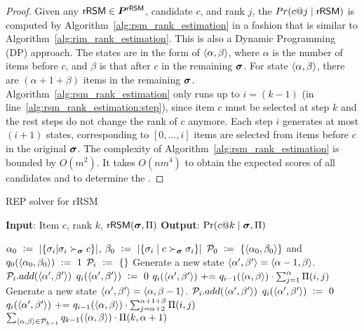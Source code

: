 \begin{proof}
    Given any $\mathsf{rRSM} \in \bm{P}^{\mathsf{rRSM}}$, candidate $c$, and rank $j$, the $Pr(c@j \mid \mathsf{rRSM})$ is computed by Algorithm~\ref{alg:rsm_rank_estimation} in a fashion that is similar to Algorithm~\ref{alg:rim_rank_estimation}.
    This is also a Dynamic Programming (DP) approach.
    The states are in the form of $\langle \alpha, \beta \rangle$, where $\alpha$ is the number of items before $c$, and $\beta$ is that after $c$ in the remaining $\bm{\sigma}$.
    For state $\langle \alpha, \beta \rangle$, there are $(\alpha + 1 + \beta)$ items in the remaining $\bm{\sigma}$.
    Algorithm~\ref{alg:rsm_rank_estimation} only runs up to $i=(k-1)$ (in line~\ref{alg:rsm_rank_estimation:step}), since item $c$ must be selected at step $k$ and the rest steps do not change the rank of $c$ anymore.
    Each step $i$ generates at most $(i + 1)$ states, corresponding to $[0, \ldots, i]$ items are selected from items before $c$ in the original $\bm{\sigma}$.
    The complexity of Algorithm~\ref{alg:rsm_rank_estimation} is bounded by $O(m^2)$.
    It takes $O(nm^4)$ to obtain the expected scores of all candidates and to determine the \mew.
    
\end{proof}

\begin{algorithm}[tb!]
    \caption{REP solver for rRSM}
    \label{alg:rsm_rank_estimation}
    \textbf{Input}: Item $c$, rank $k$, $\mathsf{rRSM}(\bm{\sigma}, \Pi)$ %
    \textbf{Output}: $\Pr(c@k \mid \bm{\sigma}, \Pi)$
    \begin{algorithmic}[1] %
        \STATE $\alpha_0 \ \mathrel{\mathop:}= \  |\{ \sigma_i | \sigma_i \succ_{\bm{\sigma}} c \}|$, $\beta_0 \ \mathrel{\mathop:}= \  |\{ \sigma_i \mid c \succ_{\bm{\sigma}} \sigma_i \}|$
        \STATE $\mathcal{P}_0 \ \mathrel{\mathop:}= \  \{ \langle \alpha_0, \beta_0 \rangle \}$ and $q_0(\langle \alpha_0, \beta_0 \rangle) \ \mathrel{\mathop:}= \  1$
         \label{alg:rsm_rank_estimation:step}
        \STATE $\mathcal{P}_i \ \mathrel{\mathop:}= \  \{  \}$
        \STATE Generate a new state $\langle \alpha', \beta' \rangle = \langle \alpha - 1, \beta \rangle$.
        \STATE $\mathcal{P}_i.add(\langle \alpha', \beta' \rangle)$
        \STATE $q_i(\langle \alpha', \beta' \rangle) \ \mathrel{\mathop:}= \  0$
        \ENDIF
        \STATE $q_i(\langle \alpha', \beta' \rangle) {\ \mathrel{{+}{=}}} \  q_{i-1}(\langle \alpha, \beta \rangle) \cdot \sum_{j=1}^{\alpha} {\Pi(i, j)}$
        \ENDIF
        \STATE Generate a new state $\langle \alpha', \beta' \rangle = \langle \alpha, \beta - 1 \rangle$.
        \STATE $\mathcal{P}_i.add(\langle \alpha', \beta' \rangle)$
        \STATE $q_i(\langle \alpha', \beta' \rangle) \ \mathrel{\mathop:}= \  0$
        \ENDIF
        \STATE $q_i(\langle \alpha', \beta' \rangle) {\ \mathrel{{+}{=}}} \  q_{i-1}(\langle \alpha, \beta \rangle) \cdot \sum_{j=\alpha + 2}^{\alpha + 1 + \beta} {\Pi(i, j)}$
        \ENDIF
        \ENDFOR
        \ENDFOR
        \RETURN  $\sum_{\langle \alpha, \beta \rangle \in \mathcal{P}_{k-1}} {q_{k - 1}(\langle \alpha, \beta \rangle) \cdot \Pi(k, \alpha + 1)}$
    \end{algorithmic}
\end{algorithm}

